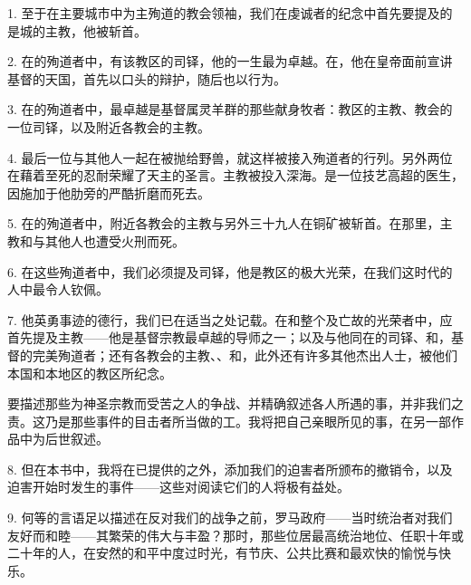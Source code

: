 1. 至于在主要城市中为主殉道的教会领袖，我们在虔诚者的纪念中首先要提及的是城的主教，他被斩首。\par

2. 在的殉道者中，有该教区的司铎，他的一生最为卓越。在，他在皇帝面前宣讲基督的天国，首先以口头的辩护，随后也以行为。\par

3. 在的殉道者中，最卓越是基督属灵羊群的那些献身牧者：教区的主教、教会的一位司铎，以及附近各教会的主教。\par

4. 最后一位与其他人一起在被抛给野兽，就这样被接入殉道者的行列。另外两位在藉着至死的忍耐荣耀了天主的圣言。主教被投入深海。是一位技艺高超的医生，因施加于他肋旁的严酷折磨而死去。\par

5. 在的殉道者中，附近各教会的主教与另外三十九人在铜矿被斩首。在那里，主教和与其他人也遭受火刑而死。\par

6. 在这些殉道者中，我们必须提及司铎，他是教区的极大光荣，在我们这时代的人中最令人钦佩。\par

7. 他英勇事迹的德行，我们已在适当之处记载。在和整个及亡故的光荣者中，应首先提及主教——他是基督宗教最卓越的导师之一；以及与他同在的司铎、和，基督的完美殉道者；还有各教会的主教、、和，此外还有许多其他杰出人士，被他们本国和本地区的教区所纪念。\par

要描述那些为神圣宗教而受苦之人的争战、并精确叙述各人所遇的事，并非我们之责。这乃是那些事件的目击者所当做的工。我将把自己亲眼所见的事，在另一部作品中为后世叙述。\par

8. 但在本书中，我将在已提供的之外，添加我们的迫害者所颁布的撤销令，以及迫害开始时发生的事件——这些对阅读它们的人将极有益处。\par

9. 何等的言语足以描述在反对我们的战争之前，罗马政府——当时统治者对我们友好而和睦——其繁荣的伟大与丰盈？那时，那些位居最高统治地位、任职十年或二十年的人，在安然的和平中度过时光，有节庆、公共比赛和最欢快的愉悦与快乐。\par

